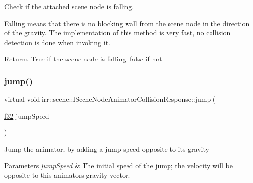 Check if the attached scene node is falling. 

Falling means that there is no blocking wall from the scene node in the direction of the gravity. The implementation of this method is very fast, no collision detection is done when invoking it. \begin{DoxyReturn}{Returns}
True if the scene node is falling, false if not. 
\end{DoxyReturn}
\mbox{\label{classirr_1_1scene_1_1ISceneNodeAnimatorCollisionResponse_a409b98d04be89fb06cce3384e0188abf}} 
\subsubsection{\texorpdfstring{jump()}{jump()}}
{\footnotesize\ttfamily virtual void irr\+::scene\+::\+I\+Scene\+Node\+Animator\+Collision\+Response\+::jump (\begin{DoxyParamCaption}\item[{\hyperlink{namespaceirr_a0277be98d67dc26ff93b1a6a1d086b07}{f32}}]{jump\+Speed }\end{DoxyParamCaption})\hspace{0.3cm}{\ttfamily [pure virtual]}}



\textquotesingle{}Jump\textquotesingle{} the animator, by adding a jump speed opposite to its gravity 


\begin{DoxyParams}{Parameters}
{\em jump\+Speed} & The initial speed of the jump; the velocity will be opposite to this animator\textquotesingle{}s gravity vector. \\
\hline
\end{DoxyParams}
\mbox{\label{classirr_1_1scene_1_1ISceneNodeAnimatorCollisionResponse_a2b97f977b446200c5dd22230aec5d275}} 
